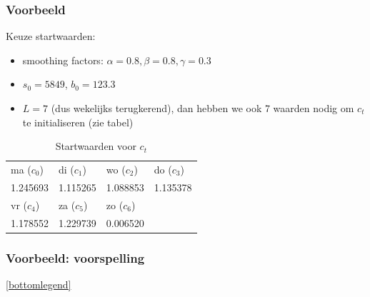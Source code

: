 \documentclass[aspectratio=169]{beamer}
\begin{document}
\begin{frame}
  \frametitle{Voorbeeld}

  Keuze startwaarden:

  \begin{itemize}
    \item smoothing factors: $\alpha = 0.8, \beta = 0.8, \gamma = 0.3$
    \item $s_0 = 5849$, $b_0 = 123.3$
    \item $L = 7$ (dus wekelijks terugkerend), dan hebben we ook 7 waarden nodig om $c_t$ te initialiseren (zie tabel)
  \end{itemize}

  \begin{table}
    \centering
    \begin{tabular}{l|l|l|l}
      ma ($c_0$) & di ($c_1$) & wo ($c_2$) & do ($c_3$)  \\
      1.245693 & 1.115265 & 1.088853 & 1.135378 \\
      \hline \hline
      vr ($c_4$)  & za ($c_5$)  & zo ($c_6$)  & \\
      1.178552 & 1.229739 & 0.006520 &
    \end{tabular}
    \caption{Startwaarden voor $c_t$}
    \label{tab:winters-init-c}
  \end{table}
\end{frame}

\begin{frame}
  \frametitle{Voorbeeld: voorspelling}


  \begin{center}

  \ref{bottomlegend}
\end{center}

\end{frame}
\end{document}
